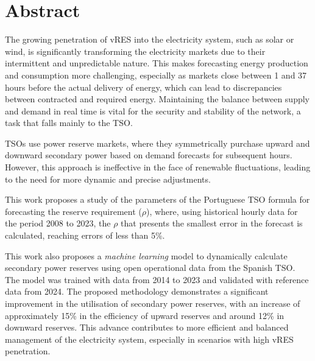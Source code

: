 \chapter{Abstract}
\justifying

The growing penetration of \gls{vRES} into the electricity system, such as solar or wind, is significantly transforming the electricity markets due to their intermittent and unpredictable nature. This makes forecasting energy production and consumption more challenging, especially as markets close between 1 and 37 hours before the actual delivery of energy, which can lead to discrepancies between contracted and required energy. Maintaining the balance between supply and demand in real time is vital for the security and stability of the network, a task that falls mainly to the \gls{TSO}.\par
\gls{TSO}s use power reserve markets, where they symmetrically purchase upward and downward secondary power based on demand forecasts for subsequent hours. However, this approach is ineffective in the face of renewable fluctuations, leading to the need for more dynamic and precise adjustments.\par
This work proposes a study of the parameters of the Portuguese \gls{TSO} formula for forecasting the reserve requirement ($\rho$), where, using historical hourly data for the period 2008 to 2023, the $\rho$ that presents the smallest error in the forecast is calculated, reaching errors of less than 5\%.\par
This work also proposes a \textit{machine learning} model to dynamically calculate secondary power reserves using open operational data from the Spanish \gls{TSO}. The model was trained with data from 2014 to 2023 and validated with reference data from 2024. The proposed methodology demonstrates a significant improvement in the utilisation of secondary power reserves, with an increase of approximately 15\% in the efficiency of upward reserves and around 12\% in downward reserves. This advance contributes to more efficient and balanced management of the electricity system, especially in scenarios with high \gls{vRES} penetration.



\vspace{0.5cm} %

